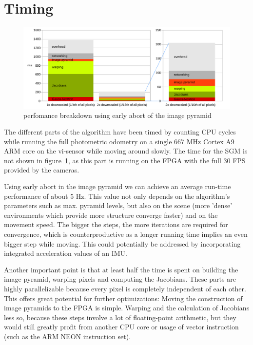 \section{Timing}
\label{sec:timing}

\begin{figure}
    \centering
    \includegraphics[width=\textwidth]{images/timing.pdf}
    \caption{perfomance breakdown using early abort of the image pyramid}
    \label{fig:timing}
\end{figure}

The different parts of the algorithm have been timed by counting CPU cycles
while running the full photometric odometry on a single 667 MHz Cortex A9 ARM
core on the vi-sensor while moving around slowly. The time for the SGM is not
shown in figure~\ref{fig:timing}, as this part is running on the FPGA with the
full 30 FPS provided by the cameras.

Using early abort in the image pyramid we can achieve an average run-time
performance of about 5 Hz.
This value not only depends on the algorithm's parameters such as max. pyramid
levels, but also on the scene (more 'dense' environments which provide more
structure converge faster) and on the movement speed. The bigger the steps, the
more iterations are required for convergence, which is counterproductive as a
longer running time implies an even bigger step while moving. This could
potentially be addressed by incorporating integrated acceleration values of an
IMU.

Another important point is that at least half the time is spent on building the
image pyramid, warping pixels and computing the Jacobians. These parts are
highly parallelizable because every pixel is completely independent of each
other. This offers great potential for further optimizations: Moving the
construction of image pyramids to the FPGA is simple. Warping and the
calculation of Jacobians less so, because these steps involve a lot of
floating-point arithmetic, but they would still greatly profit from another CPU
core or usage of vector instruction (such as the ARM NEON instruction set).
